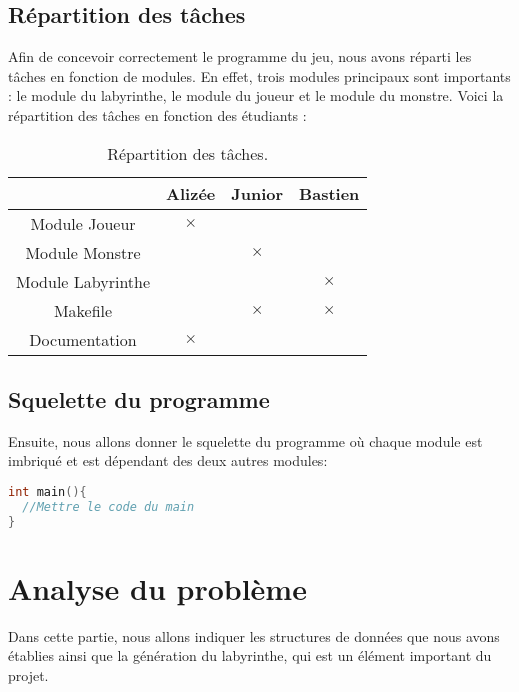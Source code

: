 \documentclass[a4paper,11pt]{report}
\begin{document}
    \section{Répartition des tâches}
    Afin de concevoir correctement le programme du jeu, nous avons réparti les tâches en fonction de modules. En effet, trois modules principaux sont importants : le module du labyrinthe, le module du joueur et le module du monstre. Voici la répartition des tâches en fonction des étudiants :
      \begin{table}[htbp]
        \center
        \caption{Répartition des tâches.}
          \begin{tabular}{|c|c c c|}
            \hline 
                                   &Alizée       &Junior       &Bastien     \\
            \hline
                Module Joueur      &$\times$     &             &              \\
                Module Monstre     &             &$\times$     &              \\
                Module Labyrinthe  &             &             &$\times$     \\
                Makefile           &             &$\times$     &$\times$     \\
                Documentation      &$\times$     &             &             \\
                
            \hline
          \end{tabular}
      \end{table}
    \section{Squelette du programme}
	Ensuite, nous allons donner le squelette du programme où chaque module est imbriqué et est dépendant des deux autres modules:

      \begin{lstlisting}[language=c]
int main(){
  //Mettre le code du main
}
      \end{lstlisting}
  \chapter{Analyse du problème}
  Dans cette partie, nous allons indiquer les structures de données que nous avons établies ainsi que la génération du labyrinthe, qui est un élément important du projet.
\end{document}
